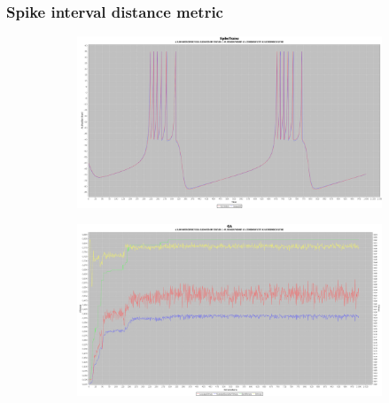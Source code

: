 \documentclass[10pt]{article}
\begin{document}
		\subsubsection{Spike interval distance metric}
			\begin{figure}[H]
				\centering
					\begin{subfigure}{.5\textwidth}
						\centering
						\includegraphics[width=\linewidth]{./../images/izzy3/interval/plot.png}
						
						\label{fig:sub8a}
					\end{subfigure}%
					\begin{subfigure}{.5\textwidth}
						\centering
						\includegraphics[width=\linewidth]{./../images/izzy3/interval/prog.png}
						
						\label{fig:sub8b}
					\end{subfigure}
					
					\label{fig:test}
			\end{figure}
			
\end{document}
